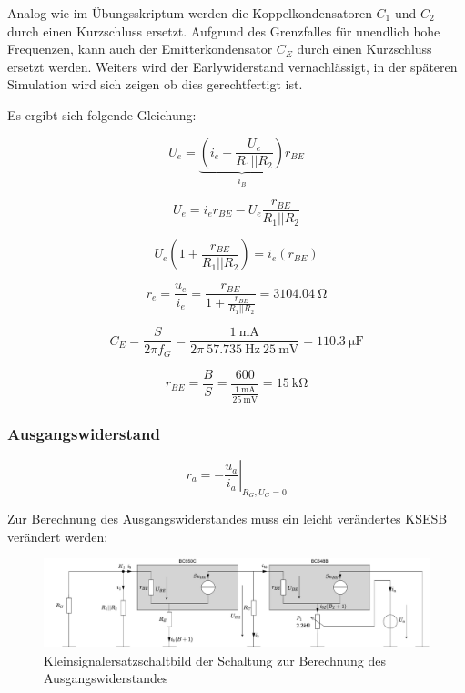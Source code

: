 Analog wie im Übungsskriptum werden die Koppelkondensatoren $C_1$ und $C_2$ durch einen Kurzschluss ersetzt. Aufgrund des Grenzfalles für unendlich hohe Frequenzen, kann auch der Emitterkondensator $C_E$ durch einen Kurzschluss ersetzt werden. Weiters wird der Earlywiderstand vernachlässigt, in der späteren Simulation wird sich zeigen ob dies gerechtfertigt ist.

Es ergibt sich folgende Gleichung:

\begin{equation}
    U_e = \underbrace{\left( i_e - \frac{U_e}{R_1 || R_2}\right)}_{i_B} r_{BE}
\end{equation}

\begin{equation}
    U_e = i_e  r_{BE}  - U_e \frac{r_{BE}}{R_1 || R_2}
\end{equation}

\begin{equation}
    U_e \left( 1 + \frac{r_{BE}}{R_1 || R_2} \right)= i_e \left( r_{BE} \right)
\end{equation}

\begin{equation}
    r_e = \frac{u_e}{i_e} = \frac{r_{BE}}{ 1 + \frac{r_{BE}}{R_1 || R_2} }= \SI{3104.04}{\ohm}
\end{equation}

\begin{equation}
    C_E = \frac{S}{2 \pi f_G} = \frac{\SI{1}{\milli \ampere}}{2 \pi \ \SI{57.735}{\hertz} \ \SI{25}{\milli \volt}} = \SI{110.3}{\micro \farad}
\end{equation}

\begin{equation}
   r_{BE} = \frac{B}{S} = \frac{600}{\frac{\SI{1}{\milli \ampere}}{\SI{25}{\milli\volt}}} = \SI{15}{\kilo \ohm} 
\end{equation}

\subsubsection{Ausgangswiderstand}

\begin{equation}
    r_a = \left. - \frac{u_a}{i_a}\right|_{R_G, U_G = 0}
\end{equation}

Zur Berechnung des Ausgangswiderstandes muss ein leicht verändertes KSESB verändert werden:

\begin{figure}[H]
    \centering
    \includegraphics[width = \textwidth]{tex/1_Microphone/pictures/KSESB_ra.pdf}
    \caption{Kleinsignalersatzschaltbild der Schaltung zur Berechnung des Ausgangswiderstandes}
    \label{fig:my_label}
\end{figure}

